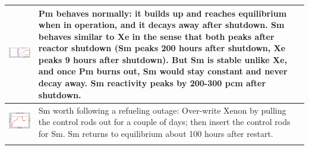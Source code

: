 \documentclass{school-22.211-notes}
\begin{document}
\begin{enumerate}
\begin{table}
  \centering
  \begin{tabular}{|p{}|p{}|}\hline
    \begin{minipage}[b]{0.5\textwidth}
      \includegraphics[width=3in]{images/dfs/Pm-Sm-1.png} 
    \end{minipage}
    & 
    \begin{minipage}[b]{0.5\textwidth}
      Pm behaves normally: it builds up and reaches equilibrium when in operation, and it decays away after shutdown. 
Sm behaves similar to Xe in the sense that both peaks after reactor shutdown (Sm peaks 200 hours after shutdown, Xe peaks 9 hours after shutdown). But Sm is stable unlike Xe, and once Pm burns out, Sm would stay constant and never decay away. Sm reactivity peaks by 200-300 pcm after shutdown. 
    \end{minipage}   \\ \hline
%
    \begin{minipage}[b]{0.5\textwidth}
      \includegraphics[width=3in]{images/dfs/Pm-Sm-2.png} 
    \end{minipage}
    & 
    \begin{minipage}[b]{0.5\textwidth}    
     Sm worth following a refueling outage: Over-write Xenon by pulling the control rods out for a couple of days; then insert the control rods for Sm. Sm returns to equilibrium about 100 hours after restart.
    \end{minipage}  \\ \hline
%
    \begin{minipage}[b]{0.5\textwidth}

\end{minipage}
\end{tabular}
\end{table}
\end{enumerate}
\end{document}
